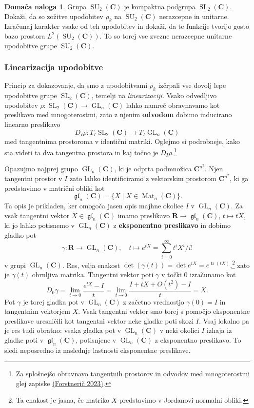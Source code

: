 \documentclass[11pt]{book}
\def\RR{\mathbf{R}}
\def\CC{\mathbf{C}}
\DeclareMathOperator\tr{tr}
\DeclareMathOperator\SU{SU}
\DeclareMathOperator\GL{GL}
\DeclareMathOperator\glfrak{\mathfrak{gl}}
\DeclareMathOperator\SL{SL}
\DeclareMathOperator\Mat{Mat}
\def\definicija{\color{rdeca}\bf}
\theoremstyle{definition}
\theoremstyle{zgled}
\theoremstyle{zgledbrezstevilke}
\theoremstyle{odprtproblem}
\theoremstyle{domacanaloga}
\newtheorem{domacanaloga}[theorem]{Domača naloga}
\theoremstyle{izrek}
\begin{document}
\begin{domacanaloga}
Grupa $\SU_2(\CC)$ je kompaktna podgrupa $\SL_2(\CC)$. Dokaži, da so zožitve upodobitev $\rho_k$ na $\SU_2(\CC)$ nerazcepne in unitarne. Izračunaj karakter vsake od teh upodobitev in dokaži, da te funkcije tvorijo gosto bazo prostora $L^2(\SU_2(\CC))$. To so torej vse zvezne nerazcepne unitarne upodobitve grupe $\SU_2(\CC)$.
\end{domacanaloga}

\subsubsection{Linearizacija upodobitve}

Princip za dokazovanje, da smo z upodobitvami $\rho_k$ izčrpali vse dovolj lepe upodobitve grupe $\SL_2(\CC)$, temelji na \emph{linearizaciji}. Vsako odvedljivo upodobitev $\rho \colon \SL_2(\CC) \to \GL_n(\CC)$ lahko namreč obravnavamo kot preslikavo med mnogoterostmi, zato z njenim {\definicija odvodom} dobimo inducirano linearno preslikavo
\[
    \textstyle D_I \rho \colon T_I \SL_2(\CC) \to T_I \GL_n(\CC)
\]
med tangentnima prostoroma v identični matriki. Oglejmo si podrobneje, kako sta videti ta dva tangentna prostora in kaj točno je $D_I \rho$.\footnote{Za splošnejšo obravnavo tangentnih prostorov in odvodov med mnogoterostmi glej zapiske \href{https://users.fmf.uni-lj.si/forstneric/papers/AMbook.pdf}{(Forstnerič 2023)}.}

Opazujmo najprej grupo $\GL_n(\CC)$, ki je odprta podmnožica $\CC^{n^2}$. Njen tangentni prostor v $I$ zato lahko identificiramo z vektorskim prostorom $\CC^{n^2}$, ki ga predstavimo v matrični obliki kot
\[
    \textstyle \glfrak_n(\CC) = \{ X \mid X \in \Mat_{n}(\CC) \}.
\]
Ta opis je prikladen, ker omogoča jasen opis majhne okolice $I$ v $\GL_n(\CC)$. Za vsak tangentni vektor $X \in \glfrak_n(\CC)$ imamo preslikavo $\RR \to \glfrak_n(\CC)$, $t \mapsto tX$, ki jo lahko potisnemo v $\GL_n(\CC)$ z {\definicija eksponentno preslikavo} in dobimo gladko pot
\[
    \gamma \colon \RR \to {\textstyle \GL_n(\CC)}, \quad
    t \mapsto e^{tX} = \sum_{i = 0}^{\infty} t^i X^i / i!
\]
v grupi $\GL_n(\CC)$. Res, velja enakost $\det(\gamma(t)) = \det e^{tX} = e^{\tr (tX)}$,\footnote{Ta enakost je jasna, če matriko $X$ predstavimo v Jordanovi normalni obliki.} zato je $\gamma(t)$ obrnljiva matrika. Tangentni vektor poti $\gamma$ v točki $0$ izračunamo kot
\[
    D_0 \gamma 
    = \lim_{t \to 0} \frac{e^{tX} - I}{t}
    = \lim_{t \to 0} \frac{I + tX + O(t^2) - I}{t}
    = X.
\]
Pot $\gamma$ je torej gladka pot v $\GL_n(\CC)$ z začetno vrednostjo $\gamma(0) = I$ in tangentnim vektorjem $X$. Vsak tangentni vektor smo torej s pomočjo eksponentne preslikave uresničili kot tangentni vektor neke gladke poti skozi $I$. Vsaj lokalno pa je res tudi obratno: vsaka gladka pot v $\GL_n(\CC)$ v neki okolici $I$ izhaja iz gladke poti v $\glfrak_n(\CC)$, potisnjene v $\GL_n(\CC)$ z eksponentno preslikavo. To sledi neposredno iz naslednje lastnosti eksponentne preslikave.
\end{document}
